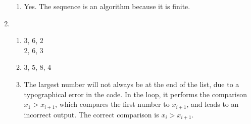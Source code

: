 \begin{enumerate}[leftmargin=2cm,labelsep=.5cm,label=\bf\arabic*.]
\begin{enumerate}
  \item Yes. The sequence is an algorithm because it is finite.\\[1cm]
\end{enumerate}
\item
\begin{enumerate}
\item 3, 6, 2\\
        2, 6, 3\\

  \item 3, 5, 8, 4\\

  \item The largest number will not always be at the end of the list, due to a typographical error in the code. In the loop, it performs the comparison $x_1 > x_{i+1}$, which compares the first number to $x_{i+1}$, and leads to an incorrect output. The correct comparison is $x_i > x_{i+1}$. \\[1cm]
\end{enumerate}
\end{enumerate}